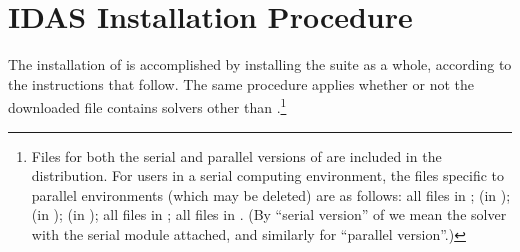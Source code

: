 \chapter{IDAS Installation Procedure}\label{s:install}

The installation of {\idas} is accomplished by installing the
{\sundials} suite as a whole, according to the instructions that
follow.   The same procedure applies whether or not the downloaded
file contains solvers other than {\idas}.\footnote{Files for both the
serial and parallel versions of {\idas} are included in the distribution.
For users in a serial computing environment, the files specific to parallel
environments (which may be deleted) are as follows:
all files in ;
 (in );
 (in ); 
 (in );
all files in ;
all files in .
(By ``serial version'' of {\idas} we mean the {\idas} solver with the
serial {\nvector} module attached, and similarly for ``parallel version''.)}

